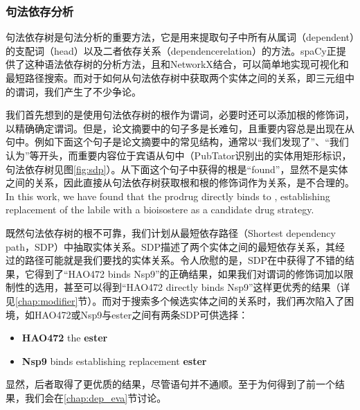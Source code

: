 \documentclass[twocolumn]{article}
\begin{document}
\subsubsection{句法依存分析\label{chap:dep}}
句法依存树是句法分析的重要方法，它是用来提取句子中所有从属词（dependent）的支配词（head）以及二者依存关系（dependencerelation）的方法。spaCy正提供了这种语法依存树的分析方法，且和NetworkX结合，可以简单地实现可视化和最短路径搜索。而对于如何从句法依存树中获取两个实体之间的关系，即三元组中的谓词，我们产生了不少争论。\par
我们首先想到的是使用句法依存树的根作为谓词，必要时还可以添加根的修饰词，以精确确定谓词。但是，论文摘要中的句子多是长难句，且重要内容总是出现在从句中。例如下面这个句子是论文摘要中的常见结构，通常以“我们发现了”、“我们认为”等开头，而重要内容位于宾语从句中（PubTator识别出的实体用矩形标识，句法依存树见图\ref{fig:sdp}）。从下面这个句子中获得的根是“found”，显然不是实体之间的关系，因此直接从句法依存树获取根和根的修饰词作为关系，是不合理的。\\
In this work, we have found that the prodrug  directly binds to , establishing replacement of the labile  with a bioisostere as a candidate drug strategy.\cite{hao472}\par
既然句法依存树的根不可靠，我们计划从最短依存路径（Shortest dependency path，SDP）中抽取实体关系。SDP描述了两个实体之间的最短依存关系，其经过的路径可能就是我们要找的实体关系。令人欣慰的是，SDP在\cite{hao472}中获得了不错的结果，它得到了“HAO472 binds Nsp9”的正确结果，如果我们对谓词的修饰词加以限制性的选用，甚至可以得到“HAO472 directly binds Nsp9”这样更优秀的结果（详见\ref{chap:modifier}节）。而对于搜索多个候选实体之间的关系时，我们再次陷入了困境，如HAO472或Nsp9与ester之间有两条SDP可供选择：\par
\begin{itemize}
	\item \textbf{HAO472} the \textbf{ester}
	\item \textbf{Nsp9} binds establishing replacement \textbf{ester}
\end{itemize}\par
显然，后者取得了更优质的结果，尽管语句并不通顺。至于为何得到了前一个结果，我们会在\ref{chap:dep_eva}节讨论。\par
\end{document}
